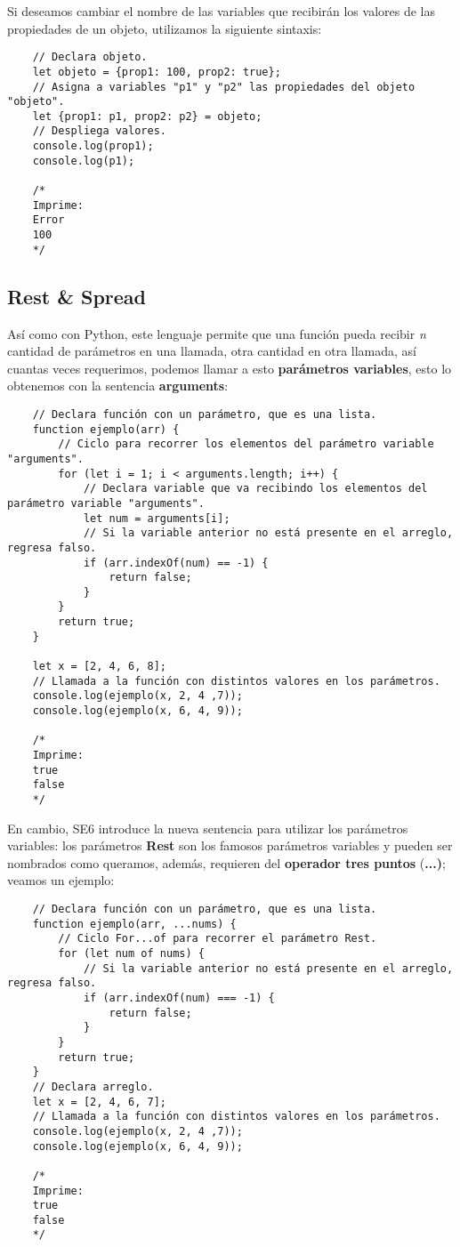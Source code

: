 Si deseamos cambiar el nombre de las variables que recibirán los valores de las propiedades de un objeto, utilizamos la siguiente sintaxis:
\begin{lstlisting}
    // Declara objeto.
    let objeto = {prop1: 100, prop2: true};
    // Asigna a variables "p1" y "p2" las propiedades del objeto "objeto".
    let {prop1: p1, prop2: p2} = objeto;
    // Despliega valores.
    console.log(prop1);
    console.log(p1);

    /*
    Imprime:
    Error
    100
    */
\end{lstlisting}


\subsection{Rest \& Spread}
\hspace{0.55cm}Así como con Python, este lenguaje permite que una función pueda recibir \textit{n} cantidad de parámetros en una llamada, otra cantidad en otra llamada, así cuantas veces requerimos, podemos llamar a esto \textbf{parámetros variables}, esto lo obtenemos con la sentencia \textbf{arguments}:
\begin{lstlisting}
    // Declara función con un parámetro, que es una lista.
    function ejemplo(arr) {
        // Ciclo para recorrer los elementos del parámetro variable "arguments".
        for (let i = 1; i < arguments.length; i++) {
            // Declara variable que va recibindo los elementos del parámetro variable "arguments".
            let num = arguments[i];
            // Si la variable anterior no está presente en el arreglo, regresa falso.
            if (arr.indexOf(num) == -1) {
                return false;
            }
        }
        return true;
    }
    
    let x = [2, 4, 6, 8];
    // Llamada a la función con distintos valores en los parámetros.
    console.log(ejemplo(x, 2, 4 ,7));
    console.log(ejemplo(x, 6, 4, 9));

    /*
    Imprime:
    true
    false
    */
\end{lstlisting}

En cambio, SE6 introduce la nueva sentencia para utilizar los parámetros variables: los parámetros \textbf{Rest} son los famosos parámetros variables y pueden ser nombrados como queramos, además, requieren del \textbf{operador tres puntos} (\textbf{...)}; veamos un ejemplo:
\begin{lstlisting}
    // Declara función con un parámetro, que es una lista.
    function ejemplo(arr, ...nums) {
        // Ciclo For...of para recorrer el parámetro Rest.
        for (let num of nums) {
            // Si la variable anterior no está presente en el arreglo, regresa falso.
            if (arr.indexOf(num) === -1) {
                return false;
            }
        }
        return true;
    }
    // Declara arreglo.
    let x = [2, 4, 6, 7];
    // Llamada a la función con distintos valores en los parámetros.
    console.log(ejemplo(x, 2, 4 ,7));
    console.log(ejemplo(x, 6, 4, 9));

    /*
    Imprime:
    true
    false
    */
\end{lstlisting}

